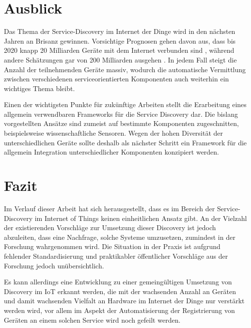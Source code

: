 \documentclass[conference,compsoc]{IEEEtran}
\begin{document}
\section{Ausblick}

Das Thema der Service-Discovery im Internet der Dinge wird in den nächsten Jahren an Brisanz gewinnen. Vorsichtige Prognosen gehen davon aus, dass bis 2020 knapp 20 Milliarden Geräte mit dem Internet verbunden sind \cite{IoT2}, während andere Schätzungen gar von 200 Milliarden ausgehen \cite{IoT1}. In jedem Fall steigt die Anzahl der teilnehmenden Geräte massiv, wodurch die automatische Vermittlung zwischen verschiedenen serviceorientierten Komponenten auch weiterhin ein wichtiges Thema bleibt.

Einen der wichtigsten Punkte für zukünftige Arbeiten stellt die Erarbeitung eines allgemein verwendbaren Frameworks für die Service Discovery dar. Die bislang vorgestellten Ansätze sind zumeist auf bestimmte Komponenten zugeschnitten, beispielsweise wissenschaftliche Sensoren. Wegen der hohen Diversität der unterschiedlichen Geräte sollte deshalb als nächster Schritt ein Framework für die allgemein Integration unterschiedlicher Komponenten konzipiert werden.

\section{Fazit}

Im Verlauf dieser Arbeit hat sich herausgestellt, dass es im Bereich der Service-Discovery im Internet of Things keinen einheitlichen Ansatz gibt. An der Vielzahl der existierenden Vorschläge zur Umsetzung dieser Discovery ist jedoch abzuleiten, dass eine Nachfrage, solche Systeme umzusetzen, zumindest in der Forschung wahrgenommen wird. Die Situation in der Praxis ist aufgrund fehlender Standardisierung und praktikabler öffentlicher Vorschläge aus der Forschung jedoch unübersichtlich.

Es kann allerdings eine Entwicklung zu einer gemeingültigen Umsetzung von Discovery im IoT erkannt werden, die mit der wachsenden Anzahl an Geräten und damit wachsenden Vielfalt an Hardware im Internet der Dinge nur verstärkt werden wird, vor allem im Aspekt der Automatisierung der Registrierung von Geräten an einem solchen Service wird noch gefeilt werden.
\end{document}
